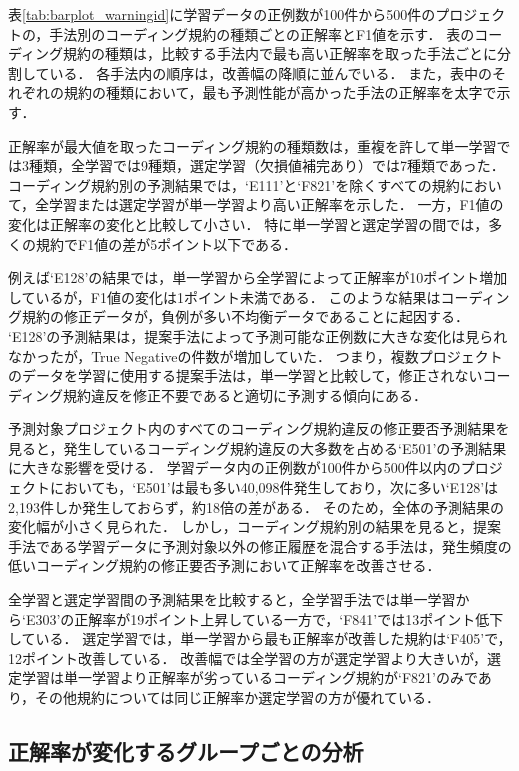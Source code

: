 \documentclass[11pt]{jreport}
\begin{document}
表\ref{tab:barplot_warningid}に学習データの正例数が100件から500件のプロジェクトの，手法別のコーディング規約の種類ごとの正解率とF1値を示す．
表のコーディング規約の種類は，比較する手法内で最も高い正解率を取った手法ごとに分割している．
各手法内の順序は，改善幅の降順に並んでいる．
また，表中のそれぞれの規約の種類において，最も予測性能が高かった手法の正解率を太字で示す．

正解率が最大値を取ったコーディング規約の種類数は，重複を許して単一学習では3種類，全学習では9種類，選定学習（欠損値補完あり）では7種類であった．
コーディング規約別の予測結果では，`E111'と`F821'を除くすべての規約において，全学習または選定学習が単一学習より高い正解率を示した．
一方，F1値の変化は正解率の変化と比較して小さい．
特に単一学習と選定学習の間では，多くの規約でF1値の差が5ポイント以下である．

例えば`E128'の結果では，単一学習から全学習によって正解率が10ポイント増加しているが，F1値の変化は1ポイント未満である．
このような結果はコーディング規約の修正データが，負例が多い不均衡データであることに起因する．
`E128'の予測結果は，提案手法によって予測可能な正例数に大きな変化は見られなかったが，True Negativeの件数が増加していた．
つまり，複数プロジェクトのデータを学習に使用する提案手法は，単一学習と比較して，修正されないコーディング規約違反を修正不要であると適切に予測する傾向にある．

予測対象プロジェクト内のすべてのコーディング規約違反の修正要否予測結果を見ると，発生しているコーディング規約違反の大多数を占める`E501'の予測結果に大きな影響を受ける．
学習データ内の正例数が100件から500件以内のプロジェクトにおいても，`E501'は最も多い40,098件発生しており，次に多い`E128'は2,193件しか発生しておらず，約18倍の差がある．
そのため，全体の予測結果の変化幅が小さく見られた．
しかし，コーディング規約別の結果を見ると，提案手法である学習データに予測対象以外の修正履歴を混合する手法は，発生頻度の低いコーディング規約の修正要否予測において正解率を改善させる．

全学習と選定学習間の予測結果を比較すると，全学習手法では単一学習から`E303'の正解率が19ポイント上昇している一方で，`F841'では13ポイント低下している．
選定学習では，単一学習から最も正解率が改善した規約は`F405'で，12ポイント改善している．
改善幅では全学習の方が選定学習より大きいが，選定学習は単一学習より正解率が劣っているコーディング規約が`F821'のみであり，その他規約については同じ正解率か選定学習の方が優れている．


\subsection{正解率が変化するグループごとの分析}
\end{document}
